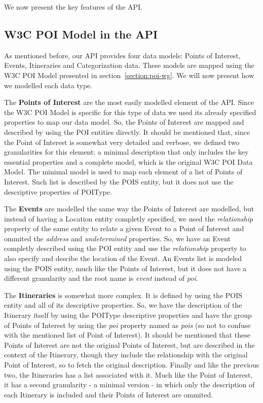 \documentclass[times]{ettauth}
\begin{document}
We now present the key features of the API.

\subsection{W3C POI Model in the API}
\label{section:api-design}
As mentioned before, our API provides four data models: Points of Interest, Events, Itineraries and Categorization data. These models are mapped using the W3C POI Model presented in section~\ref{section:poi-wg}. We will now present how we modelled each data type.

The \textbf{Points of Interest} are the most easily modelled element of the API. Since the W3C POI Model is specific for this type of data we used its already specified properties to map our data model. So, the Points of Interest are mapped and described by using the POI entities directly. It should be mentioned that, since the Point of Interest is somewhat very detailed and verbose, we defined two granularities for this element: a minimal description that only includes the key essential properties and a complete model, which is the original W3C POI Data Model. The minimal model is used to map each element of a list of Points of Interest. Such list is described by the POIS entity, but it does not use the descriptive properties of POIType.

The \textbf{Events} are modelled the same way the Points of Interest are modelled, but instead of having a Location entity completly specified, we used the \textit{relationship} property of the same entity to relate a given Event to a Point of Interest and ommited the \textit{address} and \textit{undetermined} properties. So, we have an Event completly described using the POI entity and use the \textit{relationship} property to also specify and descibe the location of the Event. An Events list is modeled using the POIS entity, much like the Points of Interest, but it does not have a different granularity and the root name is \textit{event} instead of \textit{poi}.

The \textbf{Itineraries} is somewhat more complex. It is defined by using the POIS entity and all of its descriptive properties. So, we have the description of the Itinerary itself by using the POIType descriptive properties and have the group of Points of Interest by using the \textit{poi} property named as \textit{pois} (so not to confuse with the mentioned list of Point of Interest). It should be mentioned that these Points of Interest are not the original Points of Interest, but are described in the context of the Itinerary, though they include the relationship with the original Point of Interest, so to fetch the original description. Finally and like the previous two, the Itineraries has a list associated with it. Much like the Point of Interest, it has a second granularity - a minimal version - in which only the description of each Itinerary is included and their Points of Interest are ommited.
\end{document}

